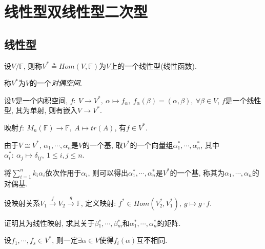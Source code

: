 
\chapter{ 线性型双线性型二次型 }

\section{ 线性型 }

\begin{definition}[线性型]
    设$V/\mathbb{F}$, 则称$V^*\triangleq Hom(V, \mathbb{F})$为$V$上的一个线性型(线性函数). \par
    称$V^*$为$V$的一个\emph{对偶空间}.
\end{definition}

\begin{example}
    设$V$是一个内积空间, $f: \ V \to V^*, \ \alpha \mapsto f_{\alpha}, \ f_{\alpha}(\beta)=(\alpha, \beta), \ \forall \beta \in V$, $f$是一个线性型, 其为单射, 则有嵌入$V\to V^*$.
\end{example}

\begin{example}
    映射$f: \ M_n(\mathbb{F}) \to \mathbb{F}, \ A \mapsto tr(A)$, 有$f\in V^*$.
\end{example}

\begin{definition}[对偶基]
    由于$V \cong V^*$, $\alpha{_1}, \cdots, \alpha{_n}$是$V$的一个基, 取$V^*$的一个向量组$\alpha{_1^*}, \cdots, \alpha{_n^*}$, 其中$\alpha{_i^*}:\ \alpha{_j}\mapsto \delta{_{ij}}, \ 1 \le i,j \le n$.\par
    将$\sum^n_{i=1}k_i\alpha{_i}$依次作用于$\alpha{_i}$, 则可以得出$\alpha{_1^*}, \cdots, \alpha{_n^*}$是$V^*$的一个基, 称其为$\alpha{_1}, \cdots, \alpha{_n}$的对偶基.
\end{definition}

\begin{example}
    设映射关系$V_1\stackrel{f}{\to} V_2\stackrel{g}{\to} \mathbb{F}$, 定义映射: $f^*\in Hom(V_2^*, V_1^*), \ g \mapsto g\cdot f$.\par
    证明其为线性映射, 求其关于$\beta{_1^*}, \cdots, \beta{_m^*}$和$\alpha{_1^*}, \cdots, \alpha{_n^*}$的矩阵.
\end{example}

\begin{statement}
    设$f_1, \cdots, f_s \in V^*$, 则一定$\exists \alpha \in V$使得$f_i(\alpha)$互不相同.
\end{statement}

